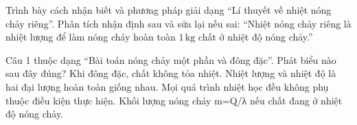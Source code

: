 \begin{bt}
Trình bày cách nhận biết và phương pháp giải dạng “Lí thuyết về nhiệt nóng chảy riêng”. Phân tích nhận định sau và sửa lại nếu sai: “Nhiệt nóng chảy riêng là nhiệt lượng để làm nóng chảy hoàn toàn $1\,\text{kg}$ chất ở nhiệt độ nóng chảy.”
\end{bt}

\begin{ex}
Câu 1 thuộc dạng “Bài toán nóng chảy một phần và đông đặc”. Phát biểu nào sau đây đúng?
\choice
{Khi đông đặc, chất không tỏa nhiệt.}
{Nhiệt lượng và nhiệt độ là hai đại lượng hoàn toàn giống nhau.}
{Mọi quá trình nhiệt học đều không phụ thuộc điều kiện thực hiện.}
{\True Khối lượng nóng chảy m=Q/λ nếu chất đang ở nhiệt độ nóng chảy.}
\end{ex}


